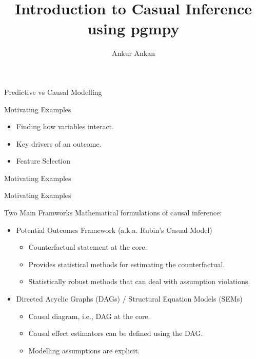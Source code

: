 \documentclass{beamer}
\begin{document}
\title[Causal Inference using pgmpy]{Introduction to Casual Inference using pgmpy}
\author{Ankur Ankan}
\date{}

\maketitle

\begin{frame}{Predictive vs Causal Modelling}
\end{frame}

\begin{frame}{Motivating Examples}
	\begin{itemize}
		\item Finding how variables interact.
		\item Key drivers of an outcome.
		\item Feature Selection
	\end{itemize}
\end{frame}

\begin{frame}{Motivating Examples}
\end{frame}

\begin{frame}{Motivating Examples}
\end{frame}

\begin{frame}{Two Main Framworks}
	Mathematical formulations of causal inference:
	\vspace{0.5em}
	\begin{itemize}
		\item Potential Outcomes Framework (a.k.a. Rubin's Casual Model)
			\begin{itemize}
				\item Counterfactual statement at the core.
				\item Provides statistical methods for estimating the counterfactual.
				\item Statistically robust methods that can deal with assumption violations.
			\end{itemize}
	\end{itemize}
	\vspace{2em}
	\begin{itemize}
		\item Directed Acyclic Graphs (DAGs) / Structural Equation Models (SEMs)
			\begin{itemize}
				\item Causal diagram, i.e., DAG at the core.
				\item Causal effect estimators can be defined using the DAG.
				\item Modelling assumptions are explicit.
			\end{itemize}
	\end{itemize}
\end{frame}
\end{document}
